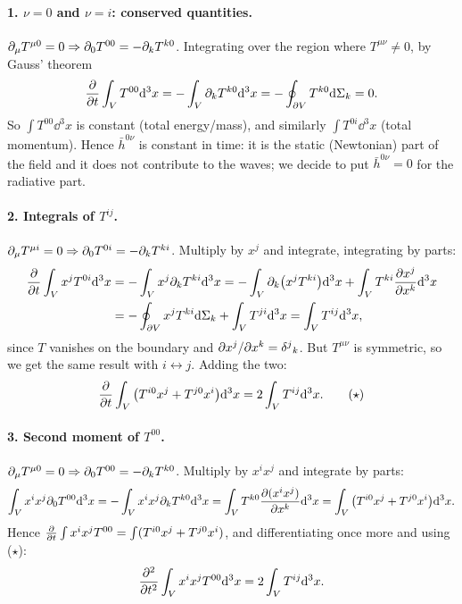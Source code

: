 \paragraph{1. $\nu=0$ and $\nu=i$: conserved quantities.} $\partial_\mu T^{\mu0}=0\Rightarrow\partial_0T^{00}=-\partial_kT^{k0}$. Integrating over the region where $T^{\mu\nu}\neq0$, by Gauss' theorem
\[
  \frac{\partial}{\partial t}\int_VT^{00}\mathrm{d}^3x=-\int_V\partial_kT^{k0}\mathrm{d}^3x=-\oint_{\partial V}T^{k0}\mathrm{d}\Sigma_k=0 .
\]
So $\int T^{00}\dd^3x$ is constant (total energy/mass), and similarly $\int T^{0i}\dd^3x$ (total momentum). Hence $\bar h^{0\nu}$ is constant in time: it is the static (Newtonian) part of the field and it does not contribute to the waves; we decide to put $\bar h^{0\nu}=0$ for the radiative part.

\paragraph{2. Integrals of $T^{ij}$.} $\partial_\mu T^{\mu i}=0\Rightarrow\partial_0T^{0i}=-\partial_kT^{ki}$. Multiply by $x^j$ and integrate, integrating by parts:
\begin{align*}
  \frac{\partial}{\partial t}\int_Vx^jT^{0i}\mathrm{d}^3x&=-\int_Vx^j\partial_kT^{ki}\mathrm{d}^3x=-\int_V\partial_k\big(x^jT^{ki}\big)\mathrm{d}^3x+\int_VT^{ki}\frac{\partial x^j}{\partial x^k}\mathrm{d}^3x\\
  &=-\oint_{\partial V}x^jT^{ki}\mathrm{d}\Sigma_k+\int_VT^{ji}\mathrm{d}^3x=\int_VT^{ij}\mathrm{d}^3x ,
\end{align*}
since $T$ vanishes on the boundary and $\partial x^j/\partial x^k=\delta^j{}_k$. But $T^{\mu\nu}$ is symmetric, so we get the same result with $i\leftrightarrow j$. Adding the two:
\begin{equation}
  \frac{\partial}{\partial t}\int_V\big(T^{i0}x^j+T^{j0}x^i\big)\mathrm{d}^3x=2\int_VT^{ij}\mathrm{d}^3x .\tag{$\star$}
\end{equation}
\paragraph{3. Second moment of $T^{00}$.} $\partial_\mu T^{\mu0}=0\Rightarrow\partial_0T^{00}=-\partial_kT^{k0}$. Multiply by $x^ix^j$ and integrate by parts:
\[
  \int_Vx^ix^j\partial_0T^{00}\mathrm{d}^3x=-\int_Vx^ix^j\partial_kT^{k0}\mathrm{d}^3x=\int_VT^{k0}\frac{\partial(x^ix^j)}{\partial x^k}\mathrm{d}^3x=\int_V\big(T^{i0}x^j+T^{j0}x^i\big)\mathrm{d}^3x .
\]
Hence $\frac{\partial}{\partial t}\int x^ix^jT^{00}=\int(T^{i0}x^j+T^{j0}x^i)$, and differentiating once more and using ($\star$):
\begin{equation}
  \frac{\partial^2}{\partial t^2}\int_Vx^ix^jT^{00}\mathrm{d}^3x=2\int_VT^{ij}\mathrm{d}^3x .
\end{equation}

